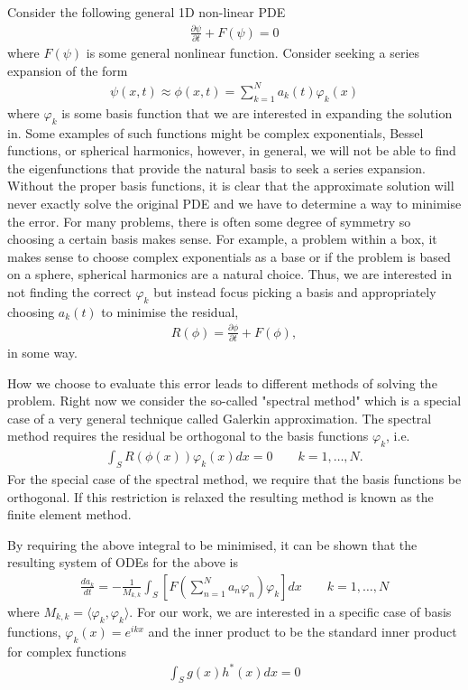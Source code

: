 Consider the following general 1D non-linear PDE
\begin{align}
\frac{\partial \psi}{\partial t} + F(\psi) = 0
\end{align}
where $F(\psi)$ is some general nonlinear function. Consider seeking a series expansion of the form
\begin{align}
\psi(x,t)\approx \phi(x,t) = \sum_{k=1}^{N}a_{k}(t)\varphi_{k}(x)
\end{align}
where $\varphi_{k}$ is some basis function that we are interested in expanding the solution in. Some examples of such functions might be complex exponentials, Bessel functions, or spherical harmonics, however, in general,  we will not be able to find the eigenfunctions that provide the natural basis to seek a series expansion. Without the proper basis functions, it is clear that the approximate solution will never exactly solve the original PDE and we have to determine a way to minimise the error. For many problems, there is often some degree of symmetry so choosing a certain basis makes sense. For example, a problem within a box, it makes sense to choose complex exponentials as a base or if the problem is based on a sphere, spherical harmonics are a natural choice. Thus, we are interested in not finding the correct $\varphi_{k}$ but instead focus picking a basis and appropriately choosing $a_{k}(t)$ to minimise the residual, 
\begin{align}
R(\phi) = \frac{\partial \phi}{\partial t} + F(\phi),
\end{align}
in some way.  

How we choose to evaluate this error leads to different methods of solving the problem. Right now we consider the so-called "spectral method" which is a special case of a very general technique called Galerkin approximation.  The spectral method requires the residual be orthogonal to the basis functions $\varphi_{k}$, i.e.
\begin{align}
\int_{S}R(\phi(x))\varphi_{k}(x)dx = 0 \qquad k=1,\ldots,N.
\end{align}
For the special case of the spectral method, we require that the basis functions be orthogonal. If this restriction is relaxed the resulting method is known as the finite element method. 

By requiring the above integral to be minimised, it can be shown\cite{durran} that the resulting system of ODEs for the above is
\begin{align}
\frac{d a_{k}}{dt} = -\frac{1}{M_{k,k}}\int_{S}\left[F\left(\sum_{n=1}^{N}a_{n}\varphi_{n}\right)\varphi_{k}\right]dx \qquad k=1,\ldots,N
\end{align}
where $M_{k,k}=\langle \varphi_{k},\varphi_{k}\rangle$. For our work, we are interested in a specific case of basis functions, $\varphi_{k}(x)=e^{ikx}$ and the inner product to be the standard inner product for complex functions
\begin{align}
\int_{S}g(x)h^{*}(x)dx=0 
\end{align}

